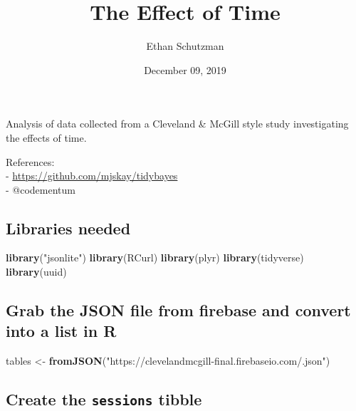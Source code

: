 \documentclass[]{article}
\title{The Effect of Time}
\author{Ethan Schutzman}
\date{December 09, 2019}
\newenvironment{Shaded}{\begin{snugshade}}{\end{snugshade}}
\newcommand{\KeywordTok}[1]{\textcolor[rgb]{0.13,0.29,0.53}{\textbf{{#1}}}}
\newcommand{\StringTok}[1]{\textcolor[rgb]{0.31,0.60,0.02}{{#1}}}
\newcommand{\NormalTok}[1]{{#1}}
\begin{document}
\maketitle

Analysis of data collected from a Cleveland \& McGill style study
investigating the effects of time.

References:\\
- \url{https://github.com/mjskay/tidybayes}\\
- @codementum

\subsection{Libraries needed}\label{libraries-needed}

\begin{Shaded}
\begin{Highlighting}[]
\KeywordTok{library}\NormalTok{(}\StringTok{"jsonlite"}\NormalTok{)}
\KeywordTok{library}\NormalTok{(RCurl)}
\KeywordTok{library}\NormalTok{(plyr)}
\KeywordTok{library}\NormalTok{(tidyverse)}
\KeywordTok{library}\NormalTok{(uuid)}
\end{Highlighting}
\end{Shaded}

\subsection{Grab the JSON file from firebase and convert into a list in
R}\label{grab-the-json-file-from-firebase-and-convert-into-a-list-in-r}

\begin{Shaded}
\begin{Highlighting}[]
\NormalTok{tables <-}\StringTok{ }\KeywordTok{fromJSON}\NormalTok{(}\StringTok{"https://clevelandmcgill-final.firebaseio.com/.json"}\NormalTok{)}
\end{Highlighting}
\end{Shaded}

\subsection{\texorpdfstring{Create the \texttt{sessions}
tibble}{Create the sessions tibble}}\label{create-the-sessions-tibble}

\begin{Shaded}
\end{Shaded}
\end{document}
